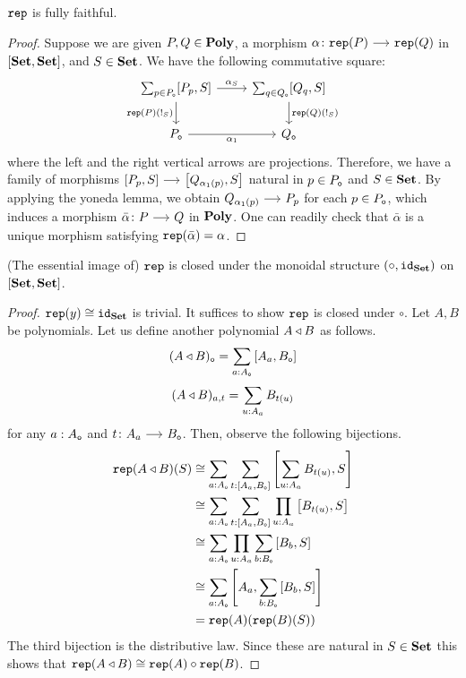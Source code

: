 \documentclass[a4paper,dvipsnames, 11pt]{amsart} %
\begin{document}
\begin{proposition}
	\label{prop:repIsFF}
	$\mathtt{rep}$ is fully faithful.
\end{proposition}
\begin{proof}
	Suppose we are given
	$P,Q\in\mathbf{Poly}$,
	a morphism $\alpha\colon\rep(P)\arr\rep(Q)$ in $\left[\mathbf{Set},\mathbf{Set}\right]$,
	and
	$S\in\mathbf{Set}$.
	We have the following commutative square:
	\[
		\begin{tikzcd}
			\sum_{p\in P_\ob}[P_p,S]
			\ar[r,"\alpha_S"]
			\ar[d,"\rep(P)(!_S)"']
				&
				\sum_{q\in Q_\ob}[Q_q,S]
				\ar[d,"\rep(Q)(!_S)"]
			\\
			P_\ob
			\ar[r,"\alpha_1"']
				&
				Q_\ob
		\end{tikzcd}
	\]
	where the left and the right vertical arrows are projections. Therefore, we have a family of morphisms
	$\left[P_p,S\right]\arr\left[Q_{\alpha_1(p)},S\right]$
	natural in $p\in P_{\mathtt{o}}$ and $S\in\mathbf{Set}$.
	By applying the yoneda lemma, we obtain $Q_{\alpha_1(p)}\arr P_p$ for each $p\in P_{\mathtt{o}}$, which induces a morphism $\bar\alpha\colon P\arr Q$ in $\mathbf{Poly}$.
	One can readily check that $\bar\alpha$ is a unique morphism satisfying $\mathtt{rep}(\bar\alpha)=\alpha$.
\end{proof}
\begin{lemma}
	\label{lem:repClosedunderMonStr}
	(The essential image of) $\mathtt{rep}$ is closed under the monoidal structure $(\circ,\mathtt{id}_{\mathbf{Set}})$ on $[\mathbf{Set},\mathbf{Set}]$.
\end{lemma}
\begin{proof}
	$\mathtt{rep}(y)\cong\mathtt{id}_{\mathbf{Set}}$ is trivial. It suffices to show $\mathtt{rep}$ is closed under $\circ$.
	Let $A,B$ be polynomials. Let us define another polynomial $A\triangleleft B$ as follows.
	\[
		(A\triangleleft B)_{\mathtt{o}}
		=\sum_{a: A_{\mathtt{o}}}\left[A_a,B_{\mathtt{o}}\right]
	\]
	\[
		(A\triangleleft B)_{a,t}
		=\sum_{u: A_a} B_{t(u)}
	\]
	for any
	$a: A_{\mathtt{o}}$ and $t\colon A_a\arr B_\ob$.
	Then, observe the following bijections.
	\begin{align*}
		\mathtt{rep}(A\triangleleft B)(S)
		&
		\cong
		\sum_{a: A_{\mathtt{o}}}\sum_{t:\left[A_a,B_{\mathtt{o}}\right]}\left[\sum_{u: A_a}B_{t(u)},S\right]
		\\
		&
		\cong
		\sum_{a: A_{\mathtt{o}}}\sum_{t:\left[A_a,B_{\mathtt{o}}\right]}\prod_{u: A_a}\left[B_{t(u)},S\right]
		\\
		&
		\cong
		\sum_{a: A_{\mathtt{o}}}\prod_{u: A_a}\sum_{b: B_{\mathtt{o}}}\left[B_{b},S\right]
		\\
		&
		\cong
		\sum_{a: A_{\mathtt{o}}}\left[A_a,\sum_{b: B_{\mathtt{o}}}\left[B_{b},S\right]\right]
		\\
		&
		=
		\mathtt{rep}(A)(\mathtt{rep}(B)(S))
	\end{align*}
	The third bijection is the distributive law.
	Since these are natural in $S\in\mathbf{Set}$ this shows that $\mathtt{rep}(A\triangleleft B)\cong\mathtt{rep}(A)\circ\mathtt{rep}(B)$.
\end{proof}
\end{document}
